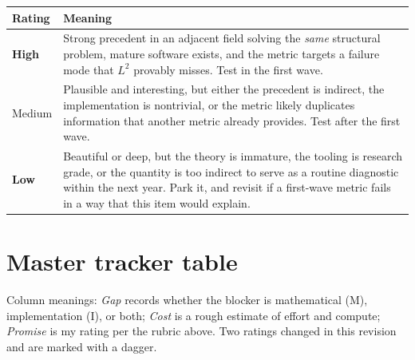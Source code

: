 \documentclass[11pt]{article}
\newcommand{\High}{\textbf{High}}
\newcommand{\Med}{Medium}
\newcommand{\Low}{\textbf{Low}}
\begin{document}
\begin{longtable}{@{}p{}p{}@{}}
\toprule
\textbf{Rating} & \textbf{Meaning} \\
\midrule
\endhead
\High{} & Strong precedent in an adjacent field solving the \emph{same} structural
problem, mature software exists, and the metric targets a failure mode that $L^2$ provably
misses. Test in the first wave. \\
\addlinespace
\Med{} & Plausible and interesting, but either the precedent is indirect, the
implementation is nontrivial, or the metric likely duplicates information that another
metric already provides. Test after the first wave. \\
\addlinespace
\Low{} & Beautiful or deep, but the theory is immature, the tooling is research grade, or
the quantity is too indirect to serve as a routine diagnostic within the next year. Park
it, and revisit if a first-wave metric fails in a way that this item would explain. \\
\bottomrule
\end{longtable}


\section{Master tracker table}
\label{sec:master}

Column meanings: \emph{Gap} records whether the blocker is mathematical (M),
implementation (I), or both; \emph{Cost} is a rough estimate of effort and compute;
\emph{Promise} is my rating per the rubric above. Two ratings changed in this revision and
are marked with a dagger.
\end{document}

